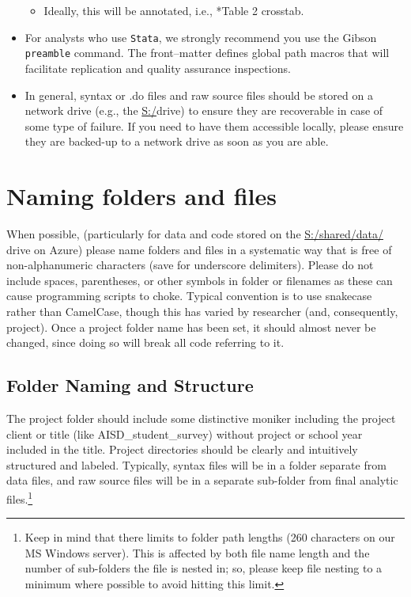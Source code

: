 \begin{itemize}
	\begin{itemize}
		\item Ideally, this will be annotated, i.e., *Table 2 crosstab.
	\end{itemize}
\item For analysts who use \texttt{Stata}, we strongly recommend you use the Gibson \texttt{preamble} command. The front--matter defines global path macros that will facilitate replication and quality assurance inspections.
\item In general, syntax or .do files and raw source files should be stored on a network drive (e.g., the \url{S:/}drive) to ensure they are recoverable in case of some type of failure. If you need to have them accessible locally, please ensure they are backed-up to a network drive as soon as you are able.
\end{itemize}

\section{Naming folders and files} \label{sec:folders}
When possible, (particularly for data and code stored on the \url{S:/shared/data/} drive on Azure) please name folders and files in a systematic way that is free of non-alphanumeric characters (save for underscore delimiters). Please do not include spaces, parentheses, or other symbols in folder or filenames as these can cause programming scripts to choke. Typical convention is to use snake\textunderscore{}case rather than CamelCase, though this has varied by researcher (and, consequently, project). Once a project folder name has been set, it should almost never be changed, since doing so will break all code referring to it.

\subsection{Folder Naming and Structure}
The project folder should include some distinctive moniker including the project client or title (like AISD\_student\_survey) without project or school year included in the title. Project directories should be clearly and intuitively structured and labeled. Typically, syntax files will be in a folder separate from data files, and raw source files will be in a separate sub-folder from final analytic files.\footnote{Keep in mind that there limits to folder path lengths (260 characters on our \textsf{MS Windows} server). This is affected by both file name length and the number of sub-folders the file is nested in; so, please keep file nesting to a minimum where possible to avoid hitting this limit.}

